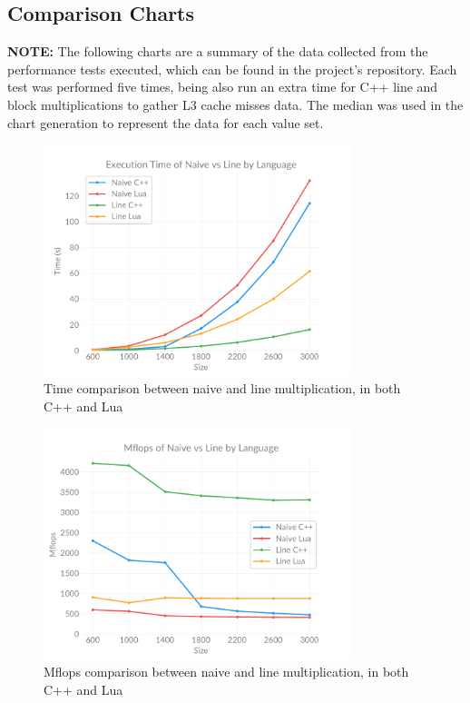 \subsection{Comparison Charts} \label{section:appendix:charts}

\textbf{NOTE:} The following charts are a summary of the data collected from the performance tests executed, which can be found in the project's repository. Each test was performed five times, being also run an extra time for C++ line and block multiplications to gather L3 cache misses data. The median was used in the chart generation to represent the data for each value set.

    \begin{figure}[ht]
        \centering
        \captionsetup{justification=centering, margin=2cm}
        \includegraphics[width=0.8\textwidth]{pdf/naive-line-time}
        \caption{Time comparison between naive and line multiplication, in both C++ and Lua}
        \label{fig:chart:naive-line-time}
    \end{figure}

    \begin{figure}[ht]
        \centering
        \captionsetup{justification=centering, margin=2cm}
        \includegraphics[width=0.8\textwidth]{pdf/naive-line-flops}
        \caption{Mflops comparison between naive and line multiplication, in both C++ and Lua}
        \label{fig:chart:naive-line-flops}
    \end{figure}

